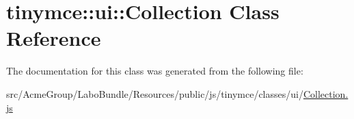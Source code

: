 \hypertarget{classtinymce_1_1ui_1_1_collection}{\section{tinymce\+:\+:ui\+:\+:Collection Class Reference}
\label{classtinymce_1_1ui_1_1_collection}
}


The documentation for this class was generated from the following file\+:\begin{DoxyCompactItemize}
\item 
src/\+Acme\+Group/\+Labo\+Bundle/\+Resources/public/js/tinymce/classes/ui/\hyperlink{_collection_8js}{Collection.\+js}\end{DoxyCompactItemize}
